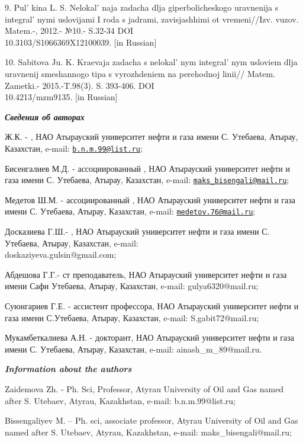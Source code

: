 \begin{references}
9. Pul' kina L. S. Nelokal' naja zadacha
dlja giperbolicheskogo uravnenija s integral' nymi
uslovijami I roda s jadrami, zavisjashhimi ot vremeni//Izv. vuzov.
Matem.-, 2012.- №10.- S.32-34 DOI \\10.3103/S1066369X12100039. {[}in
Russian{]}

10. Sabitova Ju. K. Kraevaja zadacha s nelokal' nym
integral' nym usloviem dlja uravnenij smeshannogo tipa s
vyrozhdeniem na perehodnoj linii// Matem. Zametki.- 2015.-T.98(3). S.
393-406. DOI \\10.4213/mzm9135. {[}in Russian{]}
\end{references}

\begin{authorinfo}
\emph{{\bfseries Сведения об авторах}}

Ж.К. - , НАО
Атырауский университет нефти и газа имени С. Утебаева, Атырау,
Казахстан, e-mail: \href{mailto:b.n.m.99@list.ru}{\nolinkurl{b.n.m.99@list.ru}};

Бисенгалиев М.Д. -  ассоциированный
, НАО Атырауский университет нефти и газа имени С.
Утебаева, Атырау, Казахстан, e-mail: \href{mailto:maks\_bisengali@mail.ru}{\nolinkurl{maks\_bisengali@mail.ru}};

Медетов Ш.М. -  ассоциированный
, НАО Атырауский университет нефти и газа имени С.
Утебаева, Атырау, Казахстан, e-mail: \href{mailto:medetov.76@mail.ru}{\nolinkurl{medetov.76@mail.ru}};

Досказиева Г.Ш.- , НАО
Атырауский университет нефти и газа имени С. Утебаева, Атырау,
Казахстан, e-mail: \\doskaziyeva.gulsin@gmail.com;

Абдешова Г.Г.- ст преподаватель, НАО Атырауский университет нефти и газа
имени Сафи Утебаева, Атырау, Казахстан, e-mail: gulya6320@mail.ru;

Суюнгариев Г.Е. -  ассистент профессора,
НАО Атырауский университет нефти и газа имени С.Утебаева, Атырау,
Казахстан, e-mail: S.gabit72@mail.ru;

Мукамбеткалиева А.Н. - докторант, НАО Атырауский университет нефти и
газа имени С. Утебаева, Атырау, Казахстан, e-mail: ainash\_m\_89@mail.ru.

\emph{{\bfseries Information about the authors}}

Zaidemova Zh. - Ph. Sci, Professor, Atyrau Uni󠀁versity of Oil and Gas
nam󠀁ed aft󠀁er S. Ute󠀁baev, Aty󠀁rau, Kaz󠀁akhstan, e-mail:
b.n.m.99@list.ru;

Bissengaliyev M. -- Ph. sci, associate professor, Atyrau Uni󠀁versity of
Oil and Gas nam󠀁ed aft󠀁er S. Ute󠀁baev, Aty󠀁rau, Kaz󠀁akhstan, e-mail:
maks\_bisengali@mail.ru;


\end{authorinfo}
